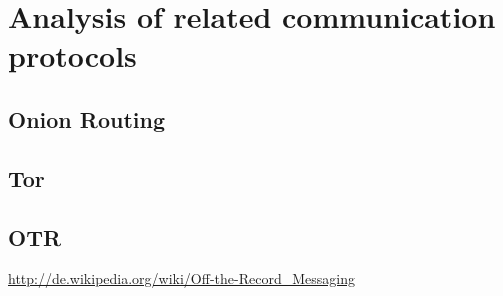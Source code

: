 \chapter{Analysis of related communication protocols}
\section{Onion Routing}
\section{Tor}
\section{OTR}
\url{http://de.wikipedia.org/wiki/Off-the-Record_Messaging}
